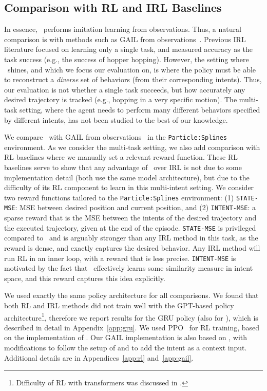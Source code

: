 \documentclass[nohyperref]{article}
\begin{document}
\subsection*{Comparison with RL and IRL Baselines}
\label{ssec:rl_baselines}

In essence, \methodname\ performs imitation learning from observations. Thus, a natural comparison is with methods such as GAIL from observations~\cite{torabi2018generative}. Previous IRL literature focused on learning only a single task, and measured accuracy as the task success (e.g., the success of hopper hopping). However, the setting where \methodname\ shines, and which we focus our evaluation on, is where the policy must be able to reconstruct a \textit{diverse} set of behaviors (from their corresponding intents). Thus, our evaluation is not whether a single task succeeds, but how accurately any desired trajectory is tracked (e.g., hopping in a very specific motion). The multi-task setting, where the agent needs to perform many different behaviors specified by different intents, has not been studied to the best of our knowledge.

We compare \methodname\ with GAIL from observations~\cite{torabi2018generative} in the \texttt{Particle:Splines} environment. As we consider the multi-task setting, we also add comparison with RL baselines where we manually set a relevant reward function. These RL baselines serve to show that any advantage of \methodname\ over IRL is not due to some implementation detail (both use the same model architecture), but due to the difficulty of its RL component to learn in this multi-intent setting. 
We consider two reward functions tailored to the \texttt{Particle:Splines} environment: (1) \texttt{STATE-MSE}: MSE between desired position and current position, and (2) \texttt{INTENT-MSE}: a sparse reward that is the MSE between the intents of the desired trajectory and the executed trajectory, given at the end of the episode. \texttt{STATE-MSE} is privileged compared to \methodname\ and is arguably stronger than any IRL method in this task, as the reward is dense, and exactly captures the desired behavior.
Any IRL method will run RL in an inner loop, with a reward that is less precise. \texttt{INTENT-MSE} is motivated by the fact that \methodname\ effectively learns some similarity measure in intent space, and this reward captures this idea explicitly.

We used exactly the same policy architecture for all comparisons. We found that both RL and IRL methods did not train well with the GPT-based policy architecture\footnote{Difficulty of RL with transformers was discussed in \citep{parisotto2020stabilizing,hausknecht2022consistent}.}, therefore we report results for the GRU policy (also for \methodname), which is described in detail in Appendix~\ref{app:gru}.
We used PPO~\citep{schulman2017proximal} for RL training, based on the implementation of \citet{pytorchrl}. Our GAIL implementation is also based on \citet{pytorchrl}, with modifications to follow the setup of \citet{torabi2018generative} and to add the intent as a context input. Additional details are in Appendices~\ref{app:rl} and~\ref{app:gail}.
\end{document}
